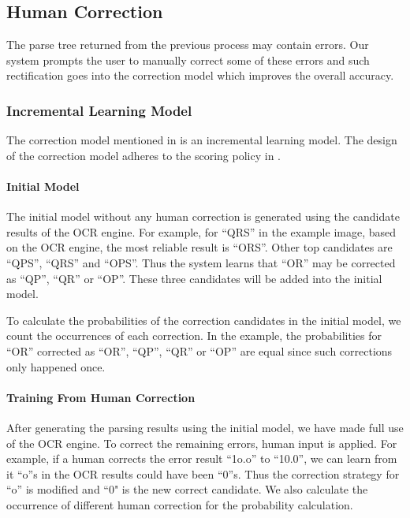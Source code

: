 \subsection{Human Correction}
\label{sec:correction}
The parse tree returned from the previous process may contain errors. 
Our system prompts the user to manually correct some of these errors
and such rectification goes into the correction model which improves the
overall accuracy.

\subsubsection{Incremental Learning Model}
\label{sec:incremental}
The correction model mentioned in  
is an incremental learning model. 
The design of the correction model adheres to the scoring
policy in .

\paragraph{Initial Model}
The initial model without any human correction
is generated using the candidate results of the OCR 
engine. For example, for ``QRS'' in the example image, based on the OCR 
engine, the most reliable result is ``ORS''. Other top candidates are 
``QPS'', ``QRS'' and ``OPS''. Thus the system learns that ``OR'' may
be corrected as ``QP'', ``QR'' or ``OP''. These three candidates 
will be added into the initial model. 

To calculate the probabilities of the correction candidates in the initial 
model, we count the occurrences of each correction. In the example, the 
probabilities for ``OR'' corrected as ``OR'', ``QP'', ``QR'' 
or ``OP'' are equal since such corrections only happened once. 


\paragraph{Training From Human Correction}
After generating the parsing results using the initial model, we have 
made full use of the OCR engine. To correct the remaining errors, 
human input is applied. 
For example, if a human corrects the error result ``1o.o'' to ``10.0'', 
we can learn from it ``o''s in the OCR results could have been
``0''s. Thus the correction strategy 
for ``o'' is modified and ``0" is the new correct candidate. 
We also calculate the occurrence 
of different human correction for the probability calculation. 

